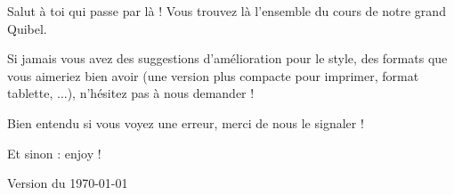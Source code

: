 \documentclass{../commun/prepacours}
\begin{document}
\begin{center}
  \vspace*{2cm}
  

  \makeatletter
  \vspace{1.5cm}
  {\Large \@filiere \par}
  \vspace{0.5cm}
  {\large \@etablissement \par}
  \vspace{2cm}
  
  \begin{minipage}{0.8\textwidth}
    \vspace{0.5cm}
    
    Salut à toi qui passe par là ! Vous trouvez là l'ensemble du cours de notre grand Quibel.

    \avspace Si jamais vous avez des suggestions d'amélioration pour le style, 
    des formats que vous aimeriez bien avoir (une version plus compacte pour 
    imprimer, format tablette, ...), n'hésitez pas à nous demander !

    \avspace Bien entendu si vous voyez une erreur, merci de nous le signaler !

    \begin{center}
      Et sinon : enjoy !
    \end{center}
    
    \vspace{0.5cm}
  \end{minipage}
  
  \vfill
  {\Large \@annee \par}
  \vspace{0.5cm}
  {\normalsize Version du \today \par}
  \vspace{1cm}
\end{center}
\makeatother
\clearpage
\end{document}
